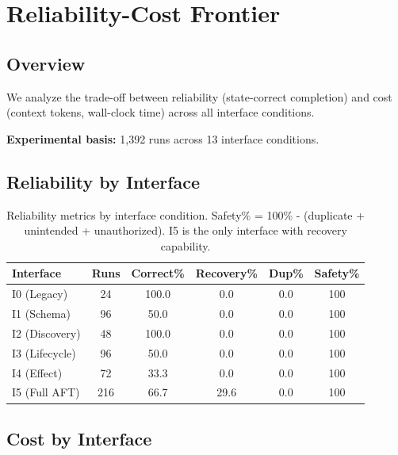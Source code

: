 
\section{Reliability-Cost Frontier}

\subsection{Overview}
We analyze the trade-off between reliability (state-correct completion) and cost (context tokens, wall-clock time) across all interface conditions.

\textbf{Experimental basis:} 1,392 runs across 13 interface conditions.

\subsection{Reliability by Interface}

\begin{table}[h]
\centering
\begin{tabular}{lccccc}
\hline
\textbf{Interface} & \textbf{Runs} & \textbf{Correct\%} & \textbf{Recovery\%} & \textbf{Dup\%} & \textbf{Safety\%} \\
\hline
I0 (Legacy) & 24 & 100.0 & 0.0 & 0.0 & 100 \\
I1 (Schema) & 96 & 50.0 & 0.0 & 0.0 & 100 \\
I2 (Discovery) & 48 & 100.0 & 0.0 & 0.0 & 100 \\
I3 (Lifecycle) & 96 & 50.0 & 0.0 & 0.0 & 100 \\
I4 (Effect) & 72 & 33.3 & 0.0 & 0.0 & 100 \\
I5 (Full AFT) & 216 & 66.7 & 29.6 & 0.0 & 100 \\
\hline
\end{tabular}
\caption{Reliability metrics by interface condition. Safety\% = 100\% - (duplicate + unintended + unauthorized). I5 is the only interface with recovery capability.}
\label{tab:reliability_by_interface}
\end{table}

\subsection{Cost by Interface}


